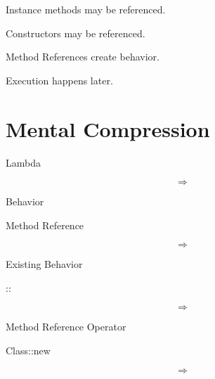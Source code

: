 \documentclass[11pt,a4paper]{book}
\begin{document}
\begin{rosettarule}

Instance methods may be referenced.

\end{rosettarule}


\begin{rosettarule}

Constructors may be referenced.

\end{rosettarule}


\begin{rosettarule}

Method References create behavior.

\end{rosettarule}


\begin{rosettarule}

Execution happens later.

\end{rosettarule}


\section{Mental Compression}

Lambda

\[
\Rightarrow
\]

Behavior


Method Reference

\[
\Rightarrow
\]

Existing Behavior


::

\[
\Rightarrow
\]

Method Reference Operator


Class::new

\[
\Rightarrow
\]
\end{document}

